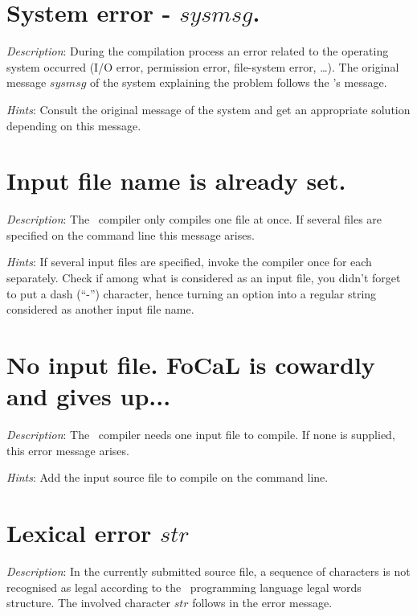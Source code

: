 \section*{System error - $sysmsg$.}
{\em Description}: During the compilation process an error related to
the operating system occurred (I/O error, permission error, file-system
error, \ldots). The original message $sysmsg$ of the system explaining
the problem follows the \focal's message.

{\em Hints}: Consult the original message of the system and get an
appropriate solution depending on this message.



\section*{Input file name is already set.}
{\em Description}: The \focal\ compiler only compiles one file at
once. If several files are specified on the command line this message
arises.

{\em Hints}: If several input files are specified, invoke the
compiler once for each separately. Check if among what is considered
as an input file, you didn't forget to put a dash (``-'') character,
hence turning an option into a regular string considered as another
input file name.



\section*{No input file. FoCaL is cowardly and gives up...}
{\em Description}: The \focal\ compiler needs one input file to
compile. If none is supplied, this error message arises.

{\em Hints}: Add the input source file to compile on the command
line.



\section*{Lexical error $str$}
{\em Description}: In the currently submitted source file, a sequence
of characters is not recognised as legal according to the
\focal\ programming language legal words structure. The involved
character $str$ follows in the error message.


